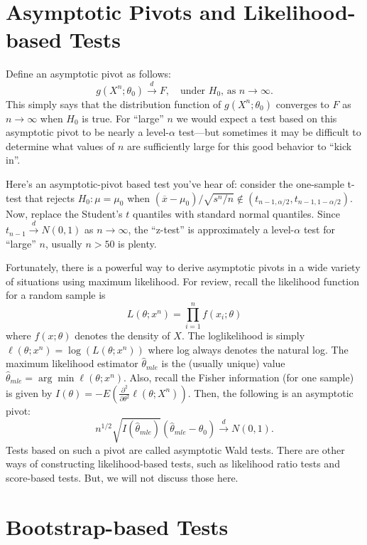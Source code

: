 \documentclass[
]{book}
\theoremstyle{definition}
\theoremstyle{definition}
\theoremstyle{definition}
\theoremstyle{definition}
\theoremstyle{remark}
\begin{document}
\hypertarget{asymptotic-pivots-and-likelihood-based-tests}{%
\section{Asymptotic Pivots and Likelihood-based Tests}\label{asymptotic-pivots-and-likelihood-based-tests}}

Define an asymptotic pivot as follows:
\[g(X^n; \theta_0)\stackrel{d}{\rightarrow} F, \quad \text{under }H_0, \, \text{as }n\rightarrow\infty.\]
This simply says that the distribution function of \(g(X^n; \theta_0)\) converges to \(F\) as \(n\rightarrow \infty\) when \(H_0\) is true. For ``large'' \(n\) we would expect a test based on this asymptotic pivot to be nearly a level-\(\alpha\) test---but sometimes it may be difficult to determine what values of \(n\) are sufficiently large for this good behavior to ``kick in''.

Here's an asymptotic-pivot based test you've hear of: consider the one-sample t-test that rejects \(H_0:\mu = \mu_0\) when \((\overline x - \mu_0)/\sqrt{s^n/n} \notin (t_{n-1,\alpha/2}, t_{n-1,1-\alpha/2})\). Now, replace the Student's \(t\) quantiles with standard normal quantiles. Since \(t_{n-1}\stackrel{d}{\rightarrow}N(0,1)\) as \(n\rightarrow \infty\), the ``z-test'' is approximately a level-\(\alpha\) test for ``large'' \(n\), usually \(n>50\) is plenty.

Fortunately, there is a powerful way to derive asymptotic pivots in a wide variety of situations using maximum likelihood. For review, recall the likelihood function for a random sample is
\[L(\theta;x^n) = \prod_{i=1}^n f(x_i;\theta)\]
where \(f(x;\theta)\) denotes the density of \(X\). The loglikelihood is simply \(\ell(\theta;x^n) = \log(L(\theta;x^n))\) where log always denotes the natural log. The maximum likelihood estimator \(\hat\theta_{mle}\) is the (usually unique) value \(\hat\theta_{mle} = \arg\min \ell(\theta;x^n)\). Also, recall the Fisher information (for one sample) is given by \(I(\theta) = -E(\frac{\partial^2}{\partial\theta^2}\ell(\theta;X^n))\). Then, the following is an asymptotic pivot:
\[n^{1/2}\sqrt{I(\hat\theta_{mle})}(\hat\theta_{mle} - \theta_0)\stackrel{d}{\rightarrow}N(0,1).\]
Tests based on such a pivot are called asymptotic Wald tests. There are other ways of constructing likelihood-based tests, such as likelihood ratio tests and score-based tests. But, we will not discuss those here.

\hypertarget{bootstrap-based-tests}{%
\section{Bootstrap-based Tests}\label{bootstrap-based-tests}}
\end{document}
